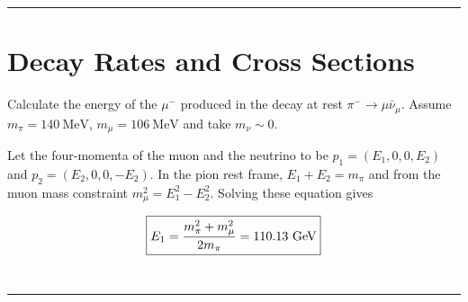 \noindent\rule{7in}{2.8pt}
\section{Decay Rates and Cross Sections}

\begin{problem}{3.1}
Calculate the energy of the $\mu^-$ produced in the decay at rest $\pi^- \rightarrow \mu\bar{\nu}_{\mu}$.
Assume $m_{\pi} = \mathrm{140 \ MeV}$, $m_{\mu} = \mathrm{106 \ MeV}$ and take $m_{\nu} \sim 0$.
\end{problem}
\begin{solution}
Let the four-momenta of the muon and the neutrino to be $p_1 = (E_1, 0, 0, E_2)$ and $p_2 = (E_2, 0, 0, -E_2)$.
In the pion rest frame, $E_1 + E_2 = m_{\pi}$ and from the muon mass constraint $m_{\mu}^2 = E_1^2 - E_2^2$.
Solving these equation gives 

\begin{align*}
    \boxed{E_1 = {m_{\pi}^2 + m_{\mu}^2 \over 2m_{\pi}} = 110.13 \text{ GeV}}
\end{align*}\\
\end{solution} 
\noindent\rule{7in}{1.5pt}



